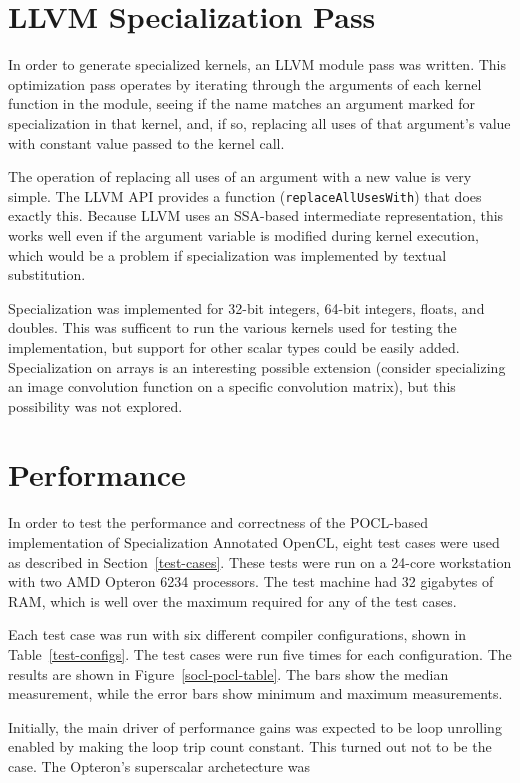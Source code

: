 \documentclass{acm_proc_article-sp}
\begin{document}
\section{LLVM Specialization Pass}

In order to generate specialized kernels, an LLVM module
pass\cite{LLVM:Doc:WritePass} was written. This optimization pass operates by
iterating through the arguments of each kernel function in the module, seeing
if the name matches an argument marked for specialization in that kernel, and,
if so, replacing all uses of that argument's value with constant value
passed to the kernel call. 

The operation of replacing all uses of an argument with a new value is very
simple. The LLVM API provides a function ({\tt replaceAllUsesWith}) that does
exactly this. Because LLVM uses an SSA-based intermediate representation, this
works well even if the argument variable is modified during kernel execution,
which would be a problem if specialization was implemented by textual
substitution.

Specialization was implemented for 32-bit integers, 64-bit integers, floats,
and doubles. This was sufficent to run the various kernels used for testing the
implementation, but support for other scalar types could be easily added.
Specialization on arrays is an interesting possible extension (consider
specializing an image convolution function on a specific convolution matrix),
but this possibility was not explored.

\section{Performance}

In order to test the performance and correctness of the POCL-based
implementation of Specialization Annotated OpenCL, eight test cases were used
as described in Section~\ref{test-cases}. These tests were run on a 24-core
workstation with two AMD Opteron 6234 processors. The test machine had 32
gigabytes of RAM, which is well over the maximum required for any of the test
cases.

Each test case was run with six different compiler configurations, shown in
Table~\ref{test-configs}. The test cases were run five times for each
configuration. The results are shown in Figure~\ref{socl-pocl-table}. The bars
show the median measurement, while the error bars show minimum and maximum
measurements.

Initially, the main driver of performance gains was expected to be loop
unrolling enabled by making the loop trip count constant. This turned out not
to be the case. The Opteron's superscalar archetecture was 
\end{document}
